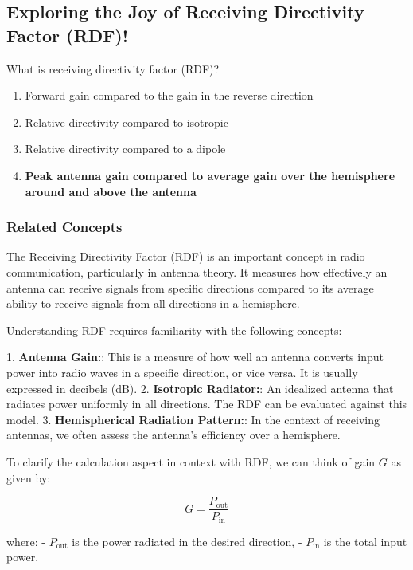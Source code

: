 \subsection{Exploring the Joy of Receiving Directivity Factor (RDF)!}

\begin{tcolorbox}[colback=gray!10, colframe=black, title=E9H03]
What is receiving directivity factor (RDF)? 
\begin{enumerate}[label=\Alph*.]
    \item Forward gain compared to the gain in the reverse direction
    \item Relative directivity compared to isotropic
    \item Relative directivity compared to a dipole
    \item \textbf{Peak antenna gain compared to average gain over the hemisphere around and above the antenna}
\end{enumerate} \end{tcolorbox}

\subsubsection{Related Concepts}

The Receiving Directivity Factor (RDF) is an important concept in radio communication, particularly in antenna theory. It measures how effectively an antenna can receive signals from specific directions compared to its average ability to receive signals from all directions in a hemisphere.

Understanding RDF requires familiarity with the following concepts:

1. \textbf{Antenna Gain:}: This is a measure of how well an antenna converts input power into radio waves in a specific direction, or vice versa. It is usually expressed in decibels (dB).
2. \textbf{Isotropic Radiator:}: An idealized antenna that radiates power uniformly in all directions. The RDF can be evaluated against this model.
3. \textbf{Hemispherical Radiation Pattern:}: In the context of receiving antennas, we often assess the antenna's efficiency over a hemisphere.

To clarify the calculation aspect in context with RDF, we can think of gain \(G\) as given by:

\[
G = \frac{P_{\text{out}}}{P_{\text{in}}}
\]

where:
- \(P_{\text{out}}\) is the power radiated in the desired direction,
- \(P_{\text{in}}\) is the total input power.

